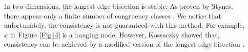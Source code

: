
In two dimensions, the longest edge bisection is stable. As proven by Stynes, there appear only a finite number of congruency classes \cite{stynes1979n,stynes1979faster,stynes1980faster}. We notice that unfortunately, the consistency is not guaranteed with this method. For example, $x$ in Figure \ref{Fig14} is a hanging node. However, Kossaczky showed that, consistency can be achieved by a modified version of the longest edge bisection \cite{kˇriˇzek1997generate}.


